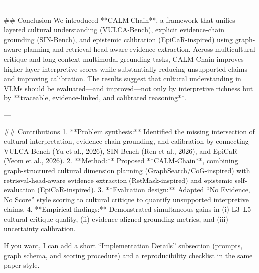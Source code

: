 ---

## Conclusion
We introduced **CALM-Chain**, a framework that unifies layered cultural understanding (VULCA-Bench), explicit evidence-chain grounding (SIN-Bench), and epistemic calibration (EpiCaR-inspired) using graph-aware planning and retrieval-head-aware evidence extraction. Across multicultural critique and long-context multimodal grounding tasks, CALM-Chain improves higher-layer interpretive scores while substantially reducing unsupported claims and improving calibration. The results suggest that cultural understanding in VLMs should be evaluated—and improved—not only by interpretive richness but by **traceable, evidence-linked, and calibrated reasoning**.

---

## Contributions
1. **Problem synthesis:** Identified the missing intersection of cultural interpretation, evidence-chain grounding, and calibration by connecting VULCA-Bench (Yu et al., 2026), SIN-Bench (Ren et al., 2026), and EpiCaR (Yeom et al., 2026).
2. **Method:** Proposed **CALM-Chain**, combining graph-structured cultural dimension planning (GraphSearch/CoG-inspired) with retrieval-head-aware evidence extraction (RetMask-inspired) and epistemic self-evaluation (EpiCaR-inspired).
3. **Evaluation design:** Adapted “No Evidence, No Score” style scoring to cultural critique to quantify unsupported interpretive claims.
4. **Empirical findings:** Demonstrated simultaneous gains in (i) L3–L5 cultural critique quality, (ii) evidence-aligned grounding metrics, and (iii) uncertainty calibration.

If you want, I can add a short “Implementation Details” subsection (prompts, graph schema, and scoring procedure) and a reproducibility checklist in the same paper style.